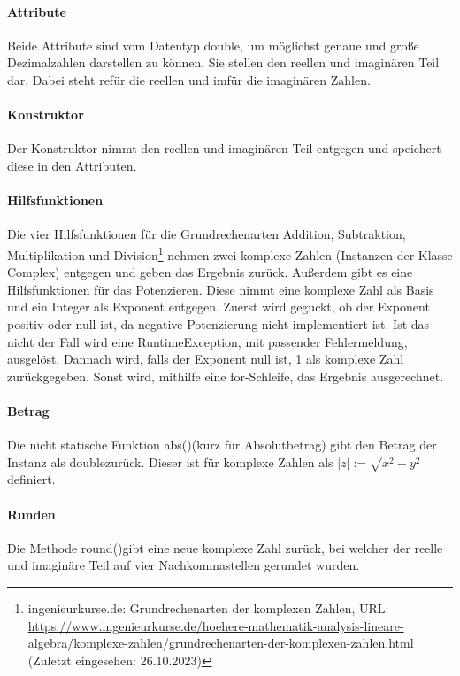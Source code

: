 \documentclass[12pt]{article}
\begin{document}
\paragraph{Attribute}
Beide Attribute sind vom Datentyp \glqq double\grqq, um möglichst genaue und große Dezimalzahlen darstellen zu können. Sie stellen den reellen und imaginären Teil dar. Dabei steht \glqq re\grqq\space für die reellen und \glqq im\grqq\space für die imaginären Zahlen.

\paragraph{Konstruktor}
Der Konstruktor nimmt den reellen und imaginären Teil entgegen und speichert diese in den Attributen.

\paragraph{Hilfsfunktionen}
Die vier Hilfsfunktionen für die Grundrechenarten Addition, Subtraktion, Multiplikation und Division\footnote{ingenieurkurse.de: Grundrechenarten der komplexen Zahlen, URL: \url{https://www.ingenieurkurse.de/hoehere-mathematik-analysis-lineare-algebra/komplexe-zahlen/grundrechenarten-der-komplexen-zahlen.html} (Zuletzt eingesehen: 26.10.2023)\label{ftn:grundrechenarten}} nehmen zwei komplexe Zahlen (Instanzen der Klasse \glqq Complex\grqq) entgegen und geben das Ergebnis zurück. 
Außerdem gibt es eine Hilfsfunktionen für das Potenzieren. Diese nimmt eine komplexe Zahl als Basis und ein Integer als Exponent entgegen. Zuerst wird geguckt, ob der Exponent positiv oder null ist, da negative Potenzierung nicht implementiert ist. Ist das nicht der Fall wird eine \glqq RuntimeException\grqq, mit passender Fehlermeldung, ausgelöst. Dannach wird, falls der Exponent null ist, 1 als komplexe Zahl zurückgegeben. Sonst wird, mithilfe eine \glqq for-Schleife\grqq, das Ergebnis ausgerechnet.

\paragraph{Betrag}
Die nicht statische Funktion \glqq abs()\grqq\space (kurz für Absolutbetrag) gibt den Betrag der Instanz als \glqq double\grqq\space zurück. Dieser ist für komplexe Zahlen als $|z| := \sqrt{x^2+y^2}$ definiert.

\paragraph{Runden}
Die Methode \glqq round()\grqq\space gibt eine neue komplexe Zahl zurück, bei welcher der reelle und imaginäre Teil auf vier Nachkommastellen gerundet wurden.
\end{document}
